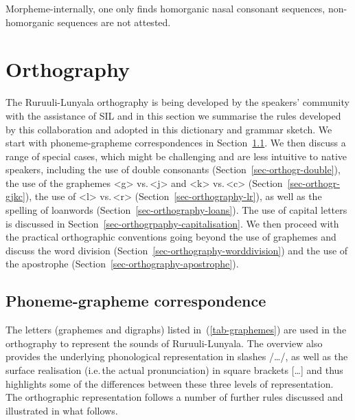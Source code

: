 Morpheme-internally, one only finds homorganic nasal consonant sequences, non-homorganic sequences are not attested. 

\section{Orthography}\label{sec-phonology-orthogrpahy}
The Ru\-ruu\-li\hyp{}Lu\-nya\-la orthography is being developed by the speakers' community with the assistance of SIL and in this section we summarise the rules developed by this collaboration and adopted in this dictionary and grammar sketch. 
We start with phoneme-grapheme correspondences in Section~\ref{sec-ortho-phoneme-grapheme}. 
We then discuss a range of special cases, which might be challenging and are less intuitive to native speakers, including the use of double consonants (Section~\ref{sec-orthogr-double}),  the use of the graphemes <g> vs.\,<j> and <k> vs.\,<c> (Section~\ref{sec-orthogr-gjkc}), the use of <l> vs.\,<r> (Section~\ref{sec-orthography-lr}), as well as the spelling of loanwords (Section~\ref{sec-orthography-loans}). 
The use of capital letters is discussed in Section~\ref{sec-orthogrpaphy-capitalisation}. 
We then proceed with the practical orthographic conventions going beyond the use of graphemes and discuss the word division (Section~\ref{sec-orthography-worddivision}) and the use of the apostrophe (Section~\ref{sec-orthography-apostrophe}).

\subsection{Phoneme-grapheme correspondence}\label{sec-ortho-phoneme-grapheme}

The letters (graphemes and digraphs) listed in~(\ref{tab-graphemes}) are used in the orthography to represent the sounds of Ru\-ruu\-li\hyp{}Lu\-nya\-la. 
The overview also provides the underlying phonological representation in slashes /…/, as well as the surface realisation (i.e.\,the actual pronunciation) in square brackets […] and thus highlights some of the differences between these three levels of representation.
The orthographic representation follows a number of further rules discussed and illustrated in what follows. 

